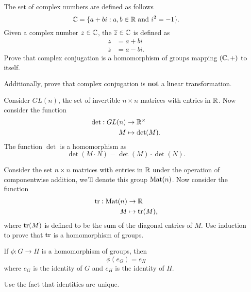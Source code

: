 \documentclass{ximera}
\begin{document}
\begin{exercise}
  The set of complex numbers are defined as follows
  \[
  \mathbb C = \{ a + b i: \text{$a,b\in\mathbb R$ and $i^2 = -1$}\}.
  \]
  Given a complex number $z\in\mathbb C$, the 
  $\overline{z}\in\mathbb C$ is defined as
  \begin{align*}
    z &= a+bi\\
    \bar{z} &= a- bi.
  \end{align*}
  Prove that complex conjugation is a homomorphism of groups mapping
  $(\mathbb C,+)$ to itself.


  Additionally, prove that complex conjugation is \textbf{not} a
  linear transformation.
\end{exercise}




\begin{example}[Determinants]\label{EG:det}
  Consider $GL(n)$, the set of invertible $n\times n$ matrices with
  entries in $\mathbb R$. Now consider the function
  \begin{align*}
    \det: GL(n) &\to \mathbb R^\times \\
             M  &\mapsto  \det(M).
  \end{align*}
  The function $\det$ is a homomorphism as
  \[
  \det(M \cdot N) = \det(M) \cdot \det(N).
  \]
\end{example}


\begin{exercise}
  Consider the set $n\times n$ matrices with entries in $\mathbb R$ under the
  operation of componentwise addition, we'll denote this group $\operatorname{Mat}(n)$. Now consider the function
  \begin{align*}
    \operatorname{tr}:\operatorname{Mat}(n) &\to \mathbb R\\
    M &\mapsto \operatorname{tr}(M),
  \end{align*}
  where $\operatorname{tr}(M)$ is defined to be the sum of the diagonal entries of
  $M$. Use induction to prove that $\operatorname{tr}$ is a homomorphism of groups.
\end{exercise}


\begin{lemma}\label{L:HPId}
  If $\phi:G\to H$ is a homomorphism of groups, then
  \[
  \phi(e_G) = e_H
  \]
  where $e_G$ is the identity of $G$ and $e_H$ is the identity of
  $H$.
  \begin{sketch}
    Use the fact that identities are unique.
  \end{sketch}
\end{lemma}
\end{document}

